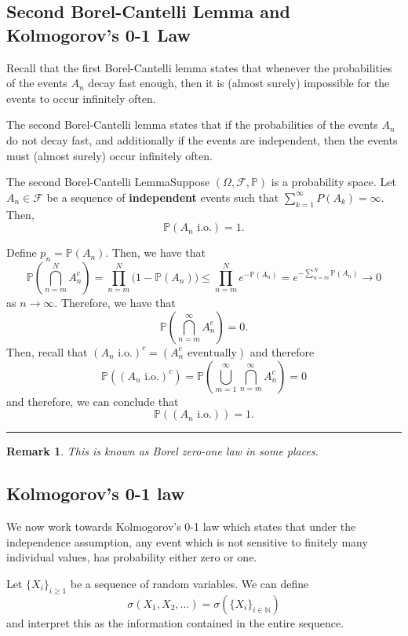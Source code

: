\documentclass[twoside]{article}
\newtheorem{remark}[theorem]{Remark}
\newenvironment{proof}{{\bf Proof:}}{\hfill\rule{2mm}{2mm}}
\newcommand{\sigmalgebra}{\mathcal{F}}
\newcommand{\prob}{\mathbb{P}}
\begin{document}
\subsection{Second Borel-Cantelli Lemma and Kolmogorov's 0-1 Law}
Recall that the first Borel-Cantelli lemma states that whenever the probabilities of the events $A_n$ decay fast enough, then it is (almost surely) impossible for the events to occur infinitely often.

The second Borel-Cantelli lemma states that if the probabilities of the events $A_n$ do not decay fast, and additionally if the events are independent, then the events must (almost surely) occur infinitely often.

\begin{theorem_exam}{The second Borel-Cantelli Lemma}{}Suppose $(\Omega, \sigmalgebra, \prob)$ is a probability space. Let $A_n \in \sigmalgebra$ be a sequence of \textbf{independent} events such that $\sum_{k=1}^{\infty}P(A_k) = \infty.$ Then, $$\prob(A_n \text{ i.o.}) = 1.$$
\end{theorem_exam}

\begin{proof} Define $p_n = \prob(A_n).$ Then, we have that 
$$
\prob(\bigcap_{n=m}^NA_n^c) = \prod_{n = m}^N\bigg(1 - \prob(A_n) \bigg) \leq \prod_{n=m}^{N}e^{-\prob(A_n)} = e^{-\sum_{n=m}^N\prob(A_n)} \rightarrow 0
$$
as $n \rightarrow \infty.$ Therefore, we have that 
$$
\prob(\bigcap_{n=m}^{\infty}A_n^c) = 0.
$$
Then, recall that $(A_n \text{ i.o.})^c = (A_n^c \text{ eventually})$ and therefore 
$$
\prob((A_n \text{ i.o.})^c) = \prob(\bigcup_{m = 1}^{\infty}\bigcap_{n = m}^{\infty}A_n^c) = 0
$$
and therefore, we can conclude that 
$$
\prob((A_n \text{ i.o.})) = 1.
$$
\end{proof}

\begin{remark} This is known as Borel zero-one law in some places.
\end{remark}

\subsection{Kolmogorov’s 0-1 law}

We now work towards Kolmogorov’s 0-1 law which states that under the independence assumption, any event which is not sensitive to finitely many individual values, has probability either zero or one.

Let $\{X_i\}_{i \geq 1}$ be a sequence of random variables. We can define 
$$
\sigma(X_1,X_2,...) = \sigma(\{X_i\}_{i \in \mathbb{N}})
$$
and interpret this as the information contained in the entire sequence.
\end{document}
